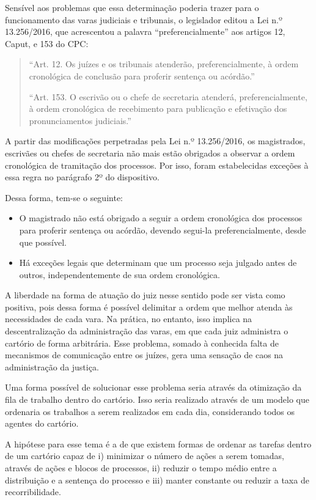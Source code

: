 \documentclass[]{report}
\providecommand{\tightlist}{%
  \setlength{\itemsep}{0pt}\setlength{\parskip}{0pt}}
\begin{document}
Sensível aos problemas que essa determinação poderia trazer para o
funcionamento das varas judiciais e tribunais, o legislador editou a Lei
n.º 13.256/2016, que acrescentou a palavra ``preferencialmente'' aos
artigos 12, Caput, e 153 do CPC:

\begin{quote}
``Art. 12. Os juízes e os tribunais atenderão, preferencialmente, à
ordem cronológica de conclusão para proferir sentença ou acórdão.''

``Art. 153. O escrivão ou o chefe de secretaria atenderá,
preferencialmente, à ordem cronológica de recebimento para publicação e
efetivação dos pronunciamentos judiciais.''
\end{quote}

A partir das modificações perpetradas pela Lei n.º 13.256/2016, os
magistrados, escrivães ou chefes de secretaria não mais estão obrigados
a observar a ordem cronológica de tramitação dos processos. Por isso,
foram estabelecidas exceções à essa regra no parágrafo 2º do
dispositivo.

Dessa forma, tem-se o seguinte:

\begin{itemize}
\tightlist
\item
  O magistrado não está obrigado a seguir a ordem cronológica dos
  processos para proferir sentença ou acórdão, devendo segui-la
  preferencialmente, desde que possível.
\item
  Há exceções legais que determinam que um processo seja julgado antes
  de outros, independentemente de sua ordem cronológica.
\end{itemize}

A liberdade na forma de atuação do juiz nesse sentido pode ser vista
como positiva, pois dessa forma é possível delimitar a ordem que melhor
atenda às necessidades de cada vara. Na prática, no entanto, isso
implica na descentralização da administração das varas, em que cada juiz
administra o cartório de forma arbitrária. Esse problema, somado à
conhecida falta de mecanismos de comunicação entre os juízes, gera uma
sensação de caos na administração da justiça.

Uma forma possível de solucionar esse problema seria através da
otimização da fila de trabalho dentro do cartório. Isso seria realizado
através de um modelo que ordenaria os trabalhos a serem realizados em
cada dia, considerando todos os agentes do cartório.

A hipótese para esse tema é a de que existem formas de ordenar as
tarefas dentro de um cartório capaz de i) minimizar o número de ações a
serem tomadas, através de ações e blocos de processos, ii) reduzir o
tempo médio entre a distribuição e a sentença do processo e iii) manter
constante ou reduzir a taxa de recorribilidade.
\end{document}

